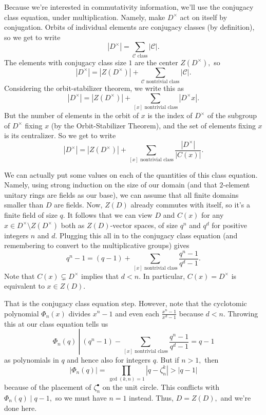 Because we're interested in commutativity information, we'll use the conjugacy class equation, under multiplication. Namely, make $D^\times$ act on itself by conjugation. Orbits of individual elements are conjugacy classes (by definition), so we get to write
\[|D^\times|=\sum_{\mathcal C\text{ class}}|\mathcal C|.\]
The elements with conjugacy class size $1$ are the center $Z(D^\times),$ so
\[|D^\times|=|Z(D^\times)|+\sum_{\mathcal C\text{ nontrivial class}}|\mathcal C|.\]
Considering the orbit-stabilizer theorem, we write this as
\[|D^\times|=|Z(D^\times)|+\sum_{[x]\text{ nontrivial class}}|D^\times x|.\]
But the number of elements in the orbit of $x$ is the index of $D^\times$ of the subgroup of $D^\times$ fixing $x$ (by the Orbit-Stabilizer Theorem), and the set of elements fixing $x$ is its centralizer. So we get to write
\[|D^\times|=|Z(D^\times)|+\sum_{[x]\text{ nontrivial class}}\frac{|D^\times|}{|C(x)|}.\]

We can actually put some values on each of the quantities of this class equation. Namely, using strong induction on the size of our domain (and that $2$-element unitary rings are fields as our base), we can assume that all finite domains smaller than $D$ are fields. Now, $Z(D)$ already commutes with itself, so it's a finite field of size $q.$ It follows that we can view $D$ and $C(x)$ for any $x\in D^\times\setminus Z(D^\times)$ both as $Z(D)$-vector spaces, of size $q^n$ and $q^d$ for positive integers $n$ and $d.$ Plugging this all in to the conjugacy class equation (and remembering to convert to the multiplicative groups) gives
\[q^n-1=(q-1)+\sum_{[x]\text{ nontrivial class}}\frac{q^n-1}{q^d-1}.\]
Note that $C(x)\subsetneq D^\times$ implies that $d<n.$ In particular, $C(x)=D^\times$ is equivalent to $x\in Z(D).$

That is the conjugacy class equation step. However, note that the cyclotomic polynomial $\Phi_n(x)$ divides $x^n-1$ and even each $\frac{x^n-1}{x^d-1}$ because $d<n.$ Throwing this at our class equation tells us
\[\Phi_n(q)~\left|~\left(q^n-1\right)-\sum_{[x]\text{ nontrivial class}}\frac{q^n-1}{q^d-1}=q-1\right.\]
as polynomials in $q$ and hence also for integers $q.$ But if $n>1,$ then
\[|\Phi_n(q)|=\prod_{\gcd(k,n)=1}\left|q-\zeta_n^k\right|>|q-1|\]
because of the placement of $\zeta_n^\bullet$ on the unit circle. This conflicts with $\Phi_n(q)\mid q-1,$ so we must have $n=1$ instead. Thus, $D=Z(D),$ and we're done here.

